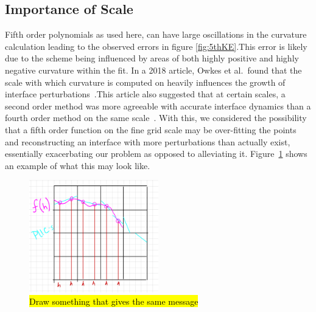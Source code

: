 \subsection{Importance of Scale}
 Fifth order polynomials as used here, can have large oscillations in the curvature calculation leading to the observed errors in figure \ref{fig:5thKE}.This error is likely due to the scheme being influenced by areas of both highly positive and highly negative curvature within the fit. In a 2018 article, Owkes et al.~found that the scale with which curvature is computed on heavily influences the growth of interface perturbations~\cite{Owkes2018}.This article also suggested that at certain scales, a second order method was more agreeable with accurate interface dynamics than a fourth order method on the same scale~\cite{Owkes2018}. With this, we considered the possibility that a fifth order function on the fine grid scale may be over-fitting the points and reconstructing an interface with more perturbations than actually exist, essentially exacerbating our problem as opposed to alleviating it. Figure~\ref{fig:draw} shows an example of what this may look like. 

\begin{figure}[htbp]
	\centering
	\includegraphics[width=0.5\textwidth]{figs/draw}
	\caption{\hl{Draw something that gives the same message}}
	\label{fig:draw}
\end{figure}

